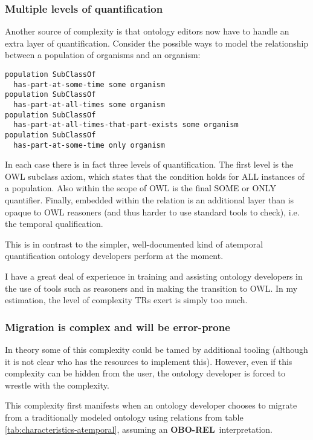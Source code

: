 \documentclass{bioinfo}
\def\OBOREL{\textbf{OBO-REL}}
\begin{document}
\subsubsection{Multiple levels of quantification}

Another source of complexity is that ontology editors now have to
handle an extra layer of quantification. Consider the possible ways to
model the relationship between a population of organisms and an
organism:

\begin{verbatim}
population SubClassOf 
  has-part-at-some-time some organism
population SubClassOf 
  has-part-at-all-times some organism
population SubClassOf 
  has-part-at-all-times-that-part-exists some organism
population SubClassOf 
  has-part-at-some-time only organism
\end{verbatim}

In each case there is in fact three levels of quantification. The
first level is the OWL subclass axiom, which states that the condition
holds for ALL instances of a population. Also within the scope of OWL
is the final SOME or ONLY quantifier. Finally, embedded within the
relation is an additional layer than is opaque to OWL reasoners (and
thus harder to use standard tools to check), i.e. the temporal
qualification.

This is in contrast to the simpler, well-documented kind of atemporal
quantification ontology developers perform at the moment.

I have a great deal of experience in training and assisting ontology
developers in the use of tools such as reasoners and in making the
transition to OWL. In my estimation, the level of complexity TRs exert
is simply too much.

\subsubsection{Migration is complex and will be error-prone}

In theory some of this complexity could be tamed by additional tooling
(although it is not clear who has the resources to implement
this). However, even if this complexity can be hidden from the user,
the ontology developer is forced to wrestle with the complexity.

This complexity first manifests when an ontology developer chooses to
migrate from a traditionally modeled ontology using relations from
table \ref{tab:characteristics-atemporal}, assuming an \OBOREL\
interpretation.
\end{document}
